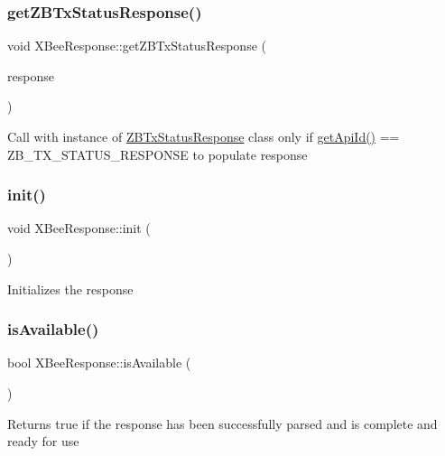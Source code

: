 \subsubsection{\texorpdfstring{get\+Z\+B\+Tx\+Status\+Response()}{getZBTxStatusResponse()}}
{\footnotesize\ttfamily void X\+Bee\+Response\+::get\+Z\+B\+Tx\+Status\+Response (\begin{DoxyParamCaption}\item[{\hyperlink{class_x_bee_response}{X\+Bee\+Response} \&}]{response }\end{DoxyParamCaption})}

Call with instance of \hyperlink{class_z_b_tx_status_response}{Z\+B\+Tx\+Status\+Response} class only if \hyperlink{class_x_bee_response_a4a9677e3b39054119fa278d1ad52130a}{get\+Api\+Id()} == Z\+B\+\_\+\+T\+X\+\_\+\+S\+T\+A\+T\+U\+S\+\_\+\+R\+E\+S\+P\+O\+N\+SE to populate response \hypertarget{class_x_bee_response_af084604e35462783ecd293ffc090d6dc}{}\label{class_x_bee_response_af084604e35462783ecd293ffc090d6dc} 
\subsubsection{\texorpdfstring{init()}{init()}}
{\footnotesize\ttfamily void X\+Bee\+Response\+::init (\begin{DoxyParamCaption}{ }\end{DoxyParamCaption})}

Initializes the response \hypertarget{class_x_bee_response_ab60b2cc9e32fa88dee132f410cc8331d}{}\label{class_x_bee_response_ab60b2cc9e32fa88dee132f410cc8331d} 
\subsubsection{\texorpdfstring{is\+Available()}{isAvailable()}}
{\footnotesize\ttfamily bool X\+Bee\+Response\+::is\+Available (\begin{DoxyParamCaption}{ }\end{DoxyParamCaption})}

Returns true if the response has been successfully parsed and is complete and ready for use \hypertarget{class_x_bee_response_a68cbc45004ff4314161b0fb1cc579b9b}{}\label{class_x_bee_response_a68cbc45004ff4314161b0fb1cc579b9b} 
